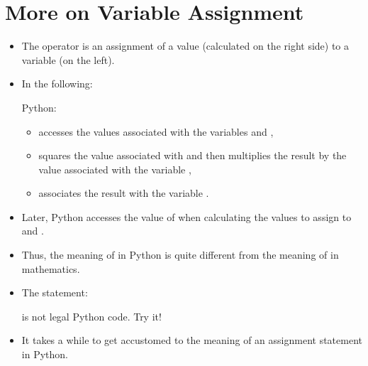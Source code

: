 \documentclass[letterpaper,10pt,english]{sphinxmanual}
\begin{document}
\section{More on Variable Assignment}
\label{\detokenize{lecture_notes/lec02_calculator:more-on-variable-assignment}}\begin{itemize}
\item {} 
The operator \sphinxcode{\sphinxupquote{=}} is an assignment of a value (calculated on the
right side) to a variable (on the left).

\item {} 
In the following:

\begin{sphinxVerbatim}[commandchars=\\\{\}]
       
\end{sphinxVerbatim}

Python:
\begin{itemize}
\item {} 
accesses the values associated with the variables  and ,

\item {} 
squares the value associated with  and then multiplies
the result by the value associated with the variable ,

\item {} 
associates the result with the variable .

\end{itemize}

\item {} 
Later, Python accesses the value of  when calculating
the values to assign to  and .

\item {} 
Thus, the meaning of \sphinxcode{\sphinxupquote{=}} in Python is quite different from the
meaning of \sphinxcode{\sphinxupquote{=}} in mathematics.

\item {} 
The statement:

\begin{sphinxVerbatim}[commandchars=\\\{\}]
     
\end{sphinxVerbatim}

is not legal Python code. Try it!

\item {} 
It takes a while to get accustomed to the meaning of an assignment
statement in Python.

\end{itemize}
\end{document}
